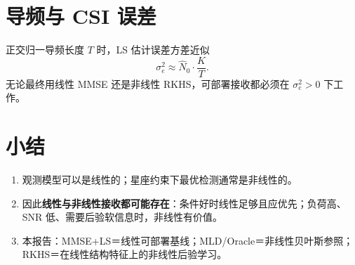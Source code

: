 \section{导频与 CSI 误差}

正交归一导频长度 $T$ 时，LS 估计误差方差近似
\begin{equation}
\sigma_e^2 \approx \hat N_0\cdot\frac{K}{T}.
\label{eq:se2}
\end{equation}
无论最终用线性 MMSE 还是非线性 RKHS，可部署接收都必须在 $\sigma_e^2>0$ 下工作。

\section{小结}

\begin{enumerate}[leftmargin=2em]
  \item 观测模型可以是线性的；星座约束下最优检测通常是非线性的。
  \item 因此\textbf{线性与非线性接收都可能存在}：条件好时线性足够且应优先；负荷高、SNR 低、需要后验软信息时，非线性有价值。
  \item 本报告：MMSE+LS＝线性可部署基线；MLD/Oracle＝非线性贝叶斯参照；RKHS＝在线性结构特征上的非线性后验学习。
\end{enumerate}
